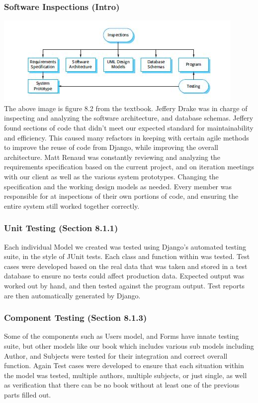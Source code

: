 \documentclass[11pt]{article}
\begin{document}
		\subsubsection{Software Inspections (Intro)}
			\includegraphics[scale=0.75]{./images/inspections} \\
			The above image is figure 8.2 from the textbook. Jeffery Drake was in charge of inspecting and analyzing the software architecture, and database schemas. 
			Jeffery found sections of code that didn't meet our expected standard for maintainability and efficiency. 
			This caused many refactors in keeping with certain agile methods to improve the reuse of code from Django, while improving the overall architecture.  
			Matt Renaud was constantly reviewing and analyzing the requirements specification based on the current project, and on iteration meetings with our client as well as the various system prototypes. 
			Changing the specification and the working design models as needed. 
			Every member was responsible for at inspections of their own portions of code, and ensuring the entire system still worked together correctly.
		\subsubsection{Unit Testing (Section 8.1.1)}

			Each individual Model we created was tested using Django's automated testing suite, in the style of JUnit tests. 
			Each class and function within was tested. 
			Test cases were developed based on the real data that was taken and stored in a test database to ensure no tests could affect production data. 
			Expected output was worked out by hand, and then tested against the program output. 
			Test reports are then automatically generated by Django. 

		\subsubsection{Component Testing (Section 8.1.3)}

			Some of the components such as Users model, and Forms have innate testing suite, but other models like our book which includes various sub models including Author, and Subjects were tested for their integration and correct overall function. 
			Again Test cases were developed to ensure that each situation within the model was tested, multiple authors, multiple subjects, or just single, as well as verification that there can be no book without at least one of the previous parts filled out.
\end{document}
